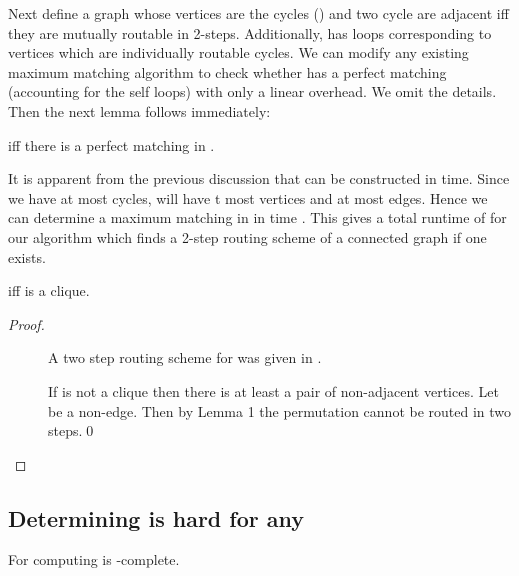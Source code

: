 \documentclass[runningheads,a4paper]{llncs}
\begin{document}
Next define a graph  whose vertices are the cycles () and two cycle are adjacent iff they are mutually routable in 2-steps. Additionally,  has loops corresponding to vertices which are individually routable cycles. We can modify any existing maximum matching algorithm to check whether  has a perfect matching (accounting for the self loops) with only a linear overhead. We omit the details. Then the next lemma follows immediately:
\begin{lemma}
	 iff there is a perfect matching in .
\end{lemma}
\noindent It is apparent from the previous discussion that  can be constructed in  time. Since we have at most  cycles,   will have t most  vertices and at most  edges. 
Hence we can determine a maximum matching in  in   time \cite{10}. This gives a total runtime of  for our algorithm which finds a 2-step routing scheme of a connected graph if one exists.
\begin{corollary}
	 iff  is a clique.
\end{corollary}
\begin{proof}
	\begin{description}
		\item[ ] A two step routing scheme for  was given in \cite{5}.
		\item[] If  is not a clique then there is at least a pair of non-adjacent vertices. Let  be a non-edge. Then by Lemma 1 the permutation  cannot be routed in two steps.\qed
	\end{description}
\end{proof}

\subsection{Determining  is hard for any }
\begin{theorem}
	For  computing  is -complete.
\end{theorem}
\end{document}

